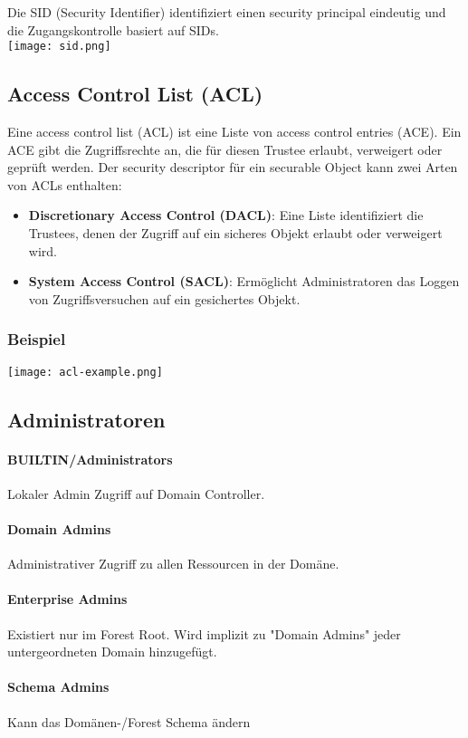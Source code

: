 Die SID (Security Identifier) identifiziert einen security principal eindeutig und die Zugangskontrolle basiert auf SIDs.\\
\texttt{[image: sid.png]}

\subsection{Access Control List (ACL)}
Eine access control list (ACL) ist eine Liste von access control entries (ACE).
Ein ACE gibt die Zugriffsrechte an, die für diesen Trustee erlaubt, verweigert oder geprüft werden.
Der security descriptor für ein securable Object kann zwei Arten von ACLs enthalten:
\begin{itemize}
  \item \textbf{Discretionary Access Control (DACL)}: Eine Liste identifiziert die Trustees, denen der Zugriff auf ein sicheres Objekt erlaubt oder verweigert wird.
  \item \textbf{System Access Control (SACL)}: Ermöglicht Administratoren das Loggen von Zugriffsversuchen auf ein gesichertes Objekt.
\end{itemize}
\subsubsection{Beispiel}
\texttt{[image: acl-example.png]}

\subsection{Administratoren}
\paragraph{BUILTIN/Administrators}
Lokaler Admin Zugriff auf Domain Controller.
\paragraph{Domain Admins}
Administrativer Zugriff zu allen Ressourcen in der Domäne.
\paragraph{Enterprise Admins}
Existiert nur im Forest Root. Wird implizit zu "Domain Admins" jeder untergeordneten Domain hinzugefügt.
\paragraph{Schema Admins}
Kann das Domänen-/Forest Schema ändern
